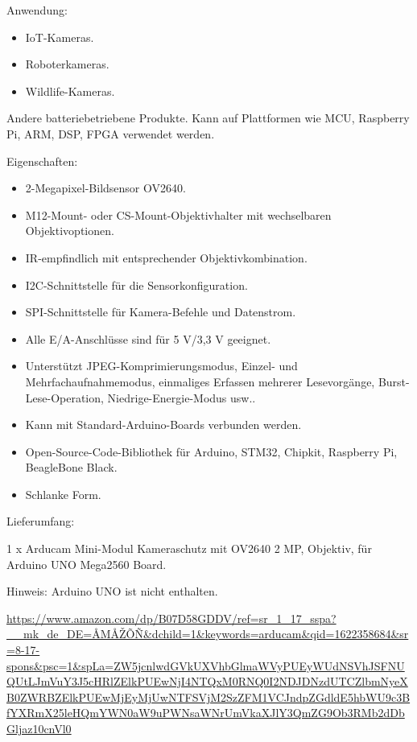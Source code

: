 Anwendung:
\begin{itemize}
  \item IoT-Kameras.
  \item Roboterkameras.
  \item Wildlife-Kameras.
\end{itemize}

Andere batteriebetriebene Produkte.
Kann auf Plattformen wie MCU, Raspberry Pi, ARM, DSP, FPGA verwendet werden.

\bigskip

Eigenschaften:

\begin{itemize}
  \item 2-Megapixel-Bildsensor OV2640.
  \item M12-Mount- oder CS-Mount-Objektivhalter mit wechselbaren Objektivoptionen.
  \item IR-empfindlich mit entsprechender Objektivkombination.
  \item I2C-Schnittstelle für die Sensorkonfiguration.
  \item SPI-Schnittstelle für Kamera-Befehle und Datenstrom.
  \item Alle E/A-Anschlüsse sind für 5 V/3,3 V geeignet.
  \item Unterstützt JPEG-Komprimierungsmodus, Einzel- und Mehrfachaufnahmemodus, einmaliges Erfassen mehrerer Lesevorgänge, Burst-Lese-Operation, Niedrige-Energie-Modus usw..
  \item Kann mit Standard-Arduino-Boards verbunden werden.
  \item Open-Source-Code-Bibliothek für Arduino, STM32, Chipkit, Raspberry Pi, BeagleBone Black.
  \item Schlanke Form.
\end{itemize}

\bigskip

Lieferumfang:

1 x Arducam Mini-Modul Kameraschutz mit OV2640 2 MP, Objektiv, für Arduino UNO Mega2560 Board.

Hinweis: Arduino UNO ist nicht enthalten.

\bigskip


\url{https://www.amazon.com/dp/B07D58GDDV/ref=sr_1_17_sspa?__mk_de_DE=ÅMÅŽÕÑ&dchild=1&keywords=arducam&qid=1622358684&sr=8-17-spons&psc=1&spLa=ZW5jcnlwdGVkUXVhbGlmaWVyPUEyWUdNSVhJSFNUQUtLJmVuY3J5cHRlZElkPUEwNjI4NTQxM0RNQ0I2NDJDNzdUTCZlbmNyeXB0ZWRBZElkPUEwMjEyMjUwNTFSVjM2SzZFM1VCJndpZGdldE5hbWU9c3BfYXRmX25leHQmYWN0aW9uPWNsaWNrUmVkaXJlY3QmZG9Ob3RMb2dDbGljaz10cnVl0}

